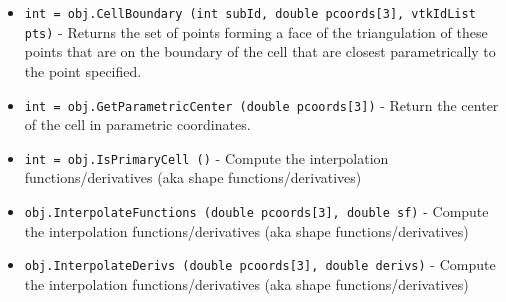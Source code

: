 \begin{itemize}
\item  \verb|int = obj.CellBoundary (int subId, double pcoords[3], vtkIdList pts)| -  Returns the set of points forming a face of the triangulation of these
 points that are on the boundary of the cell that are closest
 parametrically to the point specified.

\item  \verb|int = obj.GetParametricCenter (double pcoords[3])| -  Return the center of the cell in parametric coordinates.

\item  \verb|int = obj.IsPrimaryCell ()| -  Compute the interpolation functions/derivatives
 (aka shape functions/derivatives)

\item  \verb|obj.InterpolateFunctions (double pcoords[3], double sf)| -  Compute the interpolation functions/derivatives
 (aka shape functions/derivatives)

\item  \verb|obj.InterpolateDerivs (double pcoords[3], double derivs)| -  Compute the interpolation functions/derivatives
 (aka shape functions/derivatives)

\end{itemize}
